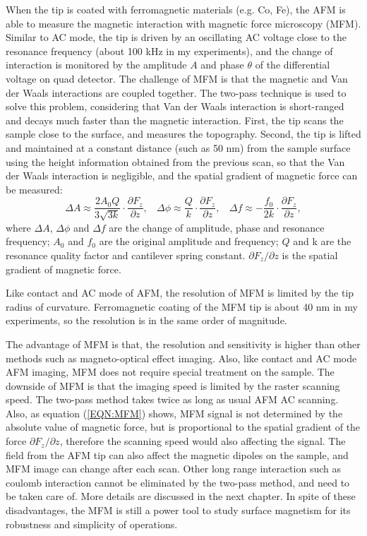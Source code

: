 \documentclass[pdflatex, sectionletters, 12pt]{pittetd}    %
\begin{document}
When the tip is coated with ferromagnetic materials (e.g. Co, Fe), the AFM is able to measure the magnetic interaction with magnetic force microscopy (MFM). Similar to AC mode, the tip is driven by an oscillating AC voltage close to the resonance frequency (about 100 kHz in my experiments), and the change of interaction is monitored by the amplitude $A$ and phase $\theta$ of the differential voltage on quad detector. The challenge of MFM is that the magnetic and Van der Waals interactions are coupled together. The two-pass technique is used to solve this problem, considering that Van der Waals interaction is short-ranged and decays much faster than the magnetic interaction. First, the tip scans the sample close to the surface, and measures the topography. Second, the tip is lifted and maintained at a constant distance (such as 50 nm) from the sample surface using the height information obtained from the previous scan, so that the Van der Waals interaction is negligible, and the spatial gradient of magnetic force can be measured\cite{hartmann1999magnetic}:
\begin{equation}
\label{EQN:MFM}
\Delta A \approx \frac{2 A_0 Q}{3\sqrt{3k}} \cdot \frac{\partial F_z}{\partial z}, \ \ \ \
\Delta \phi \approx \frac{Q}{k} \cdot \frac{\partial F_z}{\partial z}, \ \ \ \
\Delta f \approx -\frac{f_0}{2k} \cdot \frac{\partial F_z}{\partial z}, 
\end{equation}
where $\Delta A$, $\Delta \phi$ and $\Delta f$ are the change of amplitude, phase and resonance frequency; $A_0$ and $f_0$ are the original amplitude and frequency; $Q$ and k are the resonance quality factor and cantilever spring constant. $\partial F_z/\partial z$ is the spatial gradient of magnetic force. 

Like contact and AC mode of AFM, the resolution of MFM is limited by the tip radius of curvature. Ferromagnetic coating of the MFM tip is about 40 nm in my experiments, so the resolution is in the same order of magnitude. 

The advantage of MFM is that, the resolution and sensitivity is higher than other methods such as magneto-optical effect imaging. Also, like contact and AC mode AFM imaging, MFM does not require special treatment on the sample. The downside of MFM is that the imaging speed is limited by the raster scanning speed. The two-pass method takes twice as long as usual AFM AC scanning. Also, as equation (\ref{EQN:MFM}) shows, MFM signal is not determined by the absolute value of magnetic force, but is proportional to the spatial gradient of the force $\partial F_z/\partial z$, therefore the scanning speed would also affecting the signal. The field from the AFM tip can also affect the magnetic dipoles on the sample, and MFM image can change after each scan. Other long range interaction such as coulomb interaction cannot be eliminated by the two-pass method, and need to be taken care of. More details are discussed in the next chapter. In spite of these disadvantages, the MFM is still a power tool to study surface magnetism for its robustness and simplicity of operations.
\end{document}
